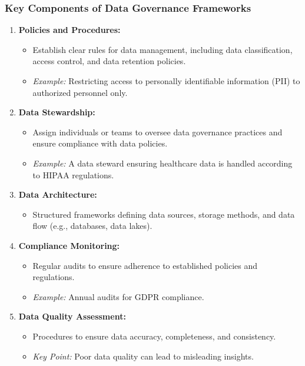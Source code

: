 \documentclass{beamer}
\begin{document}
\begin{frame}[fragile]
    \frametitle{Key Components of Data Governance Frameworks}
    \begin{enumerate}
        \item \textbf{Policies and Procedures:}
        \begin{itemize}
            \item Establish clear rules for data management, including data classification, access control, and data retention policies.
            \item \textit{Example:} Restricting access to personally identifiable information (PII) to authorized personnel only.
        \end{itemize}
        
        \item \textbf{Data Stewardship:}
        \begin{itemize}
            \item Assign individuals or teams to oversee data governance practices and ensure compliance with data policies.
            \item \textit{Example:} A data steward ensuring healthcare data is handled according to HIPAA regulations.
        \end{itemize}

        \item \textbf{Data Architecture:}
        \begin{itemize}
            \item Structured frameworks defining data sources, storage methods, and data flow (e.g., databases, data lakes).
        \end{itemize}
        
        \item \textbf{Compliance Monitoring:}
        \begin{itemize}
            \item Regular audits to ensure adherence to established policies and regulations.
            \item \textit{Example:} Annual audits for GDPR compliance.
        \end{itemize}

        \item \textbf{Data Quality Assessment:}
        \begin{itemize}
            \item Procedures to ensure data accuracy, completeness, and consistency.
            \item \textit{Key Point:} Poor data quality can lead to misleading insights.
        \end{itemize}
    \end{enumerate}
\end{frame}
\end{document}
